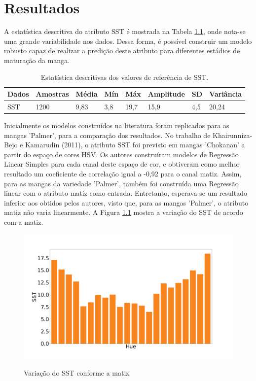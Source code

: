 \chapter{Resultados} \label{ch:RD}

A estatística descritiva do atributo SST é mostrada na Tabela \ref{tbl:sst_stat}, onde nota-se uma grande variabilidade nos dados. Dessa forma, é possível construir um modelo robusto capaz de realizar a predição deste atributo para diferentes estádios de maturação da manga.

\begin{table}[H]
\centering
\begin{tabular}{llllllll}
\hline
Dados     & Amostras & M\'edia & M\'in & M\'ax & Amplitude & SD & Vari\^ancia   \\
\hline
SST     & 1200 & 9,83 &  3,8 &  19,7 &  15,9 &  4,5 &  20,24 \\
\hline
\end{tabular}
\caption{Estatística descritivas dos valores de referência de SST.} \label{tbl:sst_stat}
\end{table}

Inicialmente os modelos construídos na literatura foram replicados para as mangas 'Palmer', para a comparação dos resultados. No trabalho de Khairunniza-Bejo e Kamarudin (2011), o atributo SST foi previsto em mangas 'Chokanan' a partir do espaço de cores HSV. Os autores construíram modelos de Regressão Linear Simples para cada canal deste espaço de cor, e obtiveram como melhor resultado um coeficiente de correlação igual a -0,92 para o canal matiz. Assim, para as mangas da variedade 'Palmer', também foi construída uma Regressão linear com o atributo matiz como entrada. Entretanto, esperava-se um resultado inferior aos obtidos pelos autores, visto que, para as mangas 'Palmer', o atributo matiz não varia linearmente. A Figura \ref{fig:hue_sst} mostra a variação do SST de acordo com a matiz. 

\begin{figure}[H]
\centering
	\caption{Variação do SST conforme a matiz.}
	\includegraphics[scale=0.18]{img/hue_sst_palmer.png}
	\label{fig:hue_sst}
\end{figure}

